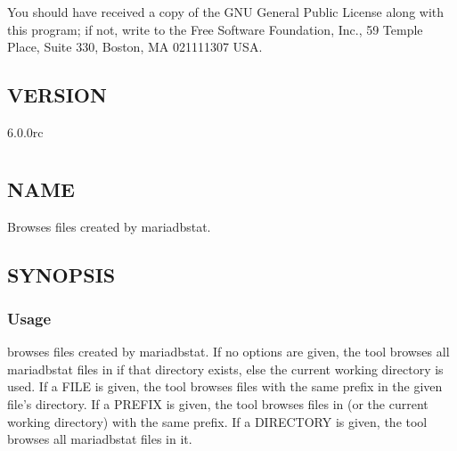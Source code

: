 \documentclass[letterpaper,10pt,english]{sphinxmanual}
\begin{document}
You should have received a copy of the GNU General Public License along with
this program; if not, write to the Free Software Foundation, Inc., 59 Temple
Place, Suite 330, Boston, MA  02111\sphinxhyphen{}1307  USA.


\section{VERSION}
\label{\detokenize{mariadb-stat:version}}
 6.0.0rc


\chapter{}
\label{\detokenize{mariadb-stat-browser:mariadb-stat-browser}}\label{\detokenize{mariadb-stat-browser::doc}}

\section{NAME}
\label{\detokenize{mariadb-stat-browser:name}}
 \sphinxhyphen{} Browses files created by mariadb\sphinxhyphen{}stat.


\section{SYNOPSIS}
\label{\detokenize{mariadb-stat-browser:synopsis}}

\subsection{Usage}
\label{\detokenize{mariadb-stat-browser:usage}}
\begin{sphinxVerbatim}[commandchars=\\\{\}]
 
\end{sphinxVerbatim}

 browses files created by mariadb\sphinxhyphen{}stat.  If no options are given,
the tool browses all mariadb\sphinxhyphen{}stat files in  if that directory
exists, else the current working directory is used.  If a FILE is given,
the tool browses files with the same prefix in the given file’s directory.
If a PREFIX is given, the tool browses files in 
(or the current working directory) with the same prefix.  If a DIRECTORY
is given, the tool browses all mariadb\sphinxhyphen{}stat files in it.
\end{document}
